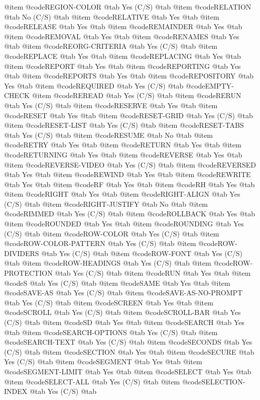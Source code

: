 @item @code{REGION-COLOR} @tab Yes	(C/S) @tab 
@item @code{RELATION} @tab No	(C/S) @tab 
@item @code{RELATIVE} @tab Yes @tab 
@item @code{RELEASE} @tab Yes @tab 
@item @code{REMAINDER} @tab Yes @tab 
@item @code{REMOVAL} @tab Yes @tab 
@item @code{RENAMES} @tab Yes @tab 
@item @code{REORG-CRITERIA} @tab Yes	(C/S) @tab 
@item @code{REPLACE} @tab Yes @tab 
@item @code{REPLACING} @tab Yes @tab 
@item @code{REPORT} @tab Yes @tab 
@item @code{REPORTING} @tab Yes @tab 
@item @code{REPORTS} @tab Yes @tab 
@item @code{REPOSITORY} @tab Yes @tab 
@item @code{REQUIRED} @tab Yes	(C/S) @tab @code{EMPTY-CHECK}
@item @code{REREAD} @tab Yes	(C/S) @tab 
@item @code{RERUN} @tab Yes	(C/S) @tab 
@item @code{RESERVE} @tab Yes @tab 
@item @code{RESET} @tab Yes @tab 
@item @code{RESET-GRID} @tab Yes	(C/S) @tab 
@item @code{RESET-LIST} @tab Yes	(C/S) @tab 
@item @code{RESET-TABS} @tab Yes	(C/S) @tab 
@item @code{RESUME} @tab No @tab 
@item @code{RETRY} @tab Yes @tab 
@item @code{RETURN} @tab Yes @tab 
@item @code{RETURNING} @tab Yes @tab 
@item @code{REVERSE} @tab Yes @tab 
@item @code{REVERSE-VIDEO} @tab Yes	(C/S) @tab 
@item @code{REVERSED} @tab Yes @tab 
@item @code{REWIND} @tab Yes @tab 
@item @code{REWRITE} @tab Yes @tab 
@item @code{RF} @tab Yes @tab 
@item @code{RH} @tab Yes @tab 
@item @code{RIGHT} @tab Yes @tab 
@item @code{RIGHT-ALIGN} @tab Yes	(C/S) @tab 
@item @code{RIGHT-JUSTIFY} @tab No @tab 
@item @code{RIMMED} @tab Yes	(C/S) @tab 
@item @code{ROLLBACK} @tab Yes @tab 
@item @code{ROUNDED} @tab Yes @tab 
@item @code{ROUNDING} @tab Yes	(C/S) @tab 
@item @code{ROW-COLOR} @tab Yes	(C/S) @tab 
@item @code{ROW-COLOR-PATTERN} @tab Yes	(C/S) @tab 
@item @code{ROW-DIVIDERS} @tab Yes	(C/S) @tab 
@item @code{ROW-FONT} @tab Yes	(C/S) @tab 
@item @code{ROW-HEADINGS} @tab Yes	(C/S) @tab 
@item @code{ROW-PROTECTION} @tab Yes	(C/S) @tab 
@item @code{RUN} @tab Yes @tab 
@item @code{S} @tab Yes	(C/S) @tab 
@item @code{SAME} @tab Yes @tab 
@item @code{SAVE-AS} @tab Yes	(C/S) @tab 
@item @code{SAVE-AS-NO-PROMPT} @tab Yes	(C/S) @tab 
@item @code{SCREEN} @tab Yes @tab 
@item @code{SCROLL} @tab Yes	(C/S) @tab 
@item @code{SCROLL-BAR} @tab Yes	(C/S) @tab 
@item @code{SD} @tab Yes @tab 
@item @code{SEARCH} @tab Yes @tab 
@item @code{SEARCH-OPTIONS} @tab Yes	(C/S) @tab 
@item @code{SEARCH-TEXT} @tab Yes	(C/S) @tab 
@item @code{SECONDS} @tab Yes	(C/S) @tab 
@item @code{SECTION} @tab Yes @tab 
@item @code{SECURE} @tab Yes	(C/S) @tab 
@item @code{SEGMENT} @tab Yes @tab 
@item @code{SEGMENT-LIMIT} @tab Yes @tab 
@item @code{SELECT} @tab Yes @tab 
@item @code{SELECT-ALL} @tab Yes	(C/S) @tab 
@item @code{SELECTION-INDEX} @tab Yes	(C/S) @tab 
